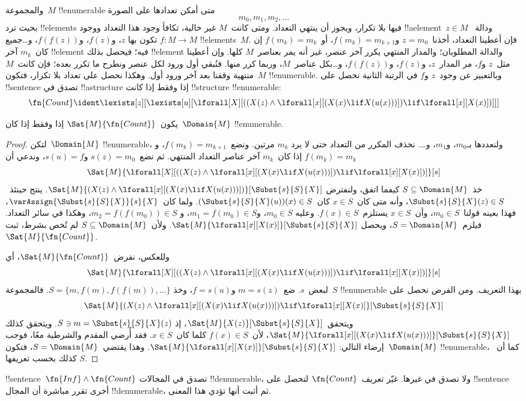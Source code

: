 \documentclass[../../../include/open-logic-section]{subfiles}
\begin{document}
والمجموعة~$M$ !!{enumerable} متى أمكن تعدادها على الصورة
\[
m_0, m_1, m_2, \dots
\]
بحيث ترد !!{element}s فيها بلا تكرار، ويجوز أن ينتهي التعداد.
ومتى كانت~$M$ غير خالية، تكافأ وجود هذا التعداد ووجود
!!a{element}~$z \in M$ ودالة~$f\colon M \to M$ تكون بها
  $z$، و$f(z)$، و$f(f(z))$، و\dots جميع !!{element}s~$M$.
  فإن أعطينا التعداد، أخذنا~$z = m_0$ و$f(m_k) = m_{k+1}$،
  أو~$f(m_k) = m_k$ إن كان~$m_k$ آخر !!{element} فيه؛
  فيحصل بذلك !!{element} والدالة المطلوبان؛ والمدار المنتهي يكرر
  آخر عنصر، غير أنه يمر بعناصر~$M$ كلها.
  وإن أعطينا مثل~$z$ و$f$، مر المدار~$z$، و$f(z)$،
  و$f(f(z))$، و\dots بكل عناصر~$M$، وربما كرر منها.
  فنُبقي أول ورود لكل عنصر ونطرح ما تكرر بعده؛ فإن كانت~$M$
  منتهية وقفنا بعد آخر ورود أول. وهكذا نحصل على تعداد بلا تكرار،
  فتكون~$M$ !!{enumerable}.
وبالتعبير عن وجود~$z$ و$f$ في الرتبة الثانية نحصل على
!!{sentence} تصدق في !!a{structure} إذا وفقط إذا كانت
!!{structure} !!{enumerable}:
\[
\fn{Count} \ident
\lexists[z][\lexists[u][\lforall[X][((X(z) \land
      \lforall[x][(X(x) \lif X(u(x)))]) \lif \lforall[x][X(x)])]]]
\]

\begin{prop}
يكون~$\Sat{M}{\fn{Count}}$ إذا وفقط إذا كان~$\Domain{M}$ !!{enumerable}.
\end{prop}

\begin{proof}
لتكن~$\Domain{M}$ !!{enumerable}، ولنعددها
بـ$m_0$، و$m_1$، و\dots. نحذف المكرر من التعداد حتى لا يرد
$m_k$ مرتين. ونضع~$f(m_k) = m_{k+1}$،
و$f(m_k)=m_k$ إذا كان~$m_k$ آخر عناصر التعداد المنتهي.
ثم نضع~$s(z) = m_0$ و$s(u) = f$، وندعي أن
\[
\Sat{M}{\lforall[X][((X(z) \land \lforall[x][(X(x) \lif X(u(x)))])
    \lif \lforall[x][X(x)])]}[s]
\]
خذ~$S \subseteq \Domain{M}$ كيفما اتفق، ولنفترض
$\Sat{M}{(X(z) \land \lforall[x][(X(x) \lif
X(u(x)))])}[\Subst{s}{S}{X}]$.
ينتج حينئذ~$\Subst{s}{S}{X}(z) \in S$،
وأنه متى كان~$x \in S$ كان~$(\Subst{s}{S}{X}(u))(x) \in S$.
ولما كان~$\varAssign{\Subst{s}{S}{X}}{s}{X}$،
فهذا بعينه قولنا~$m_0 \in S$، وأن~$x \in S$
يستلزم~$f(x) \in S$. وعليه
$m_0 \in S$، و$m_1 = f(m_0) \in S$، و
$m_2 = f(f(m_0)) \in S$، وهكذا في سائر التعداد.
فيلزم~$S = \Domain{M}$، ويحصل
$\Sat{M}{\lforall[x][X(x)]}[\Subst{s}{S}{X}]$.
ولأن~$S \subseteq \Domain{M}$ لم تُخص بشرط، ثبت
$\Sat{M}{\fn{Count}}$.

وللعكس، نفرض~$\Sat{M}{\fn{Count}}$، أي
\[
\Sat{M}{\lforall[X][((X(z) \land \lforall[x][(X(x) \lif X(u(x)))])
    \lif \lforall[x][X(x)])]}[s]
\]
لبعض~$s$. ضع~$m = s(z)$ و$f = s(u)$، وخذ
$S = \{m, f(m), f(f(m)), \dots\}$. فالمجموعة~$S$
!!{enumerable} بهذا التعريف. ومن الفرض نحصل على
\[
\Sat{M}{(X(z) \land \lforall[x][(X(x) \lif X(u(x)))])
    \lif \lforall[x][X(x)]}[\Subst{s}{S}{X}]
\]
ويتحقق~$\Sat{M}{X(z)}[\Subst{s}{S}{X}]$، إذ
$S \ni m = \Subst{s}{S}{X}(z)$. ويتحقق كذلك
$\Sat{M}{\lforall[x][(X(x) \lif
X(u(x)))]}[\Subst{s}{S}{X}]$، لأن~$f(x) \in S$ كلما كان~$x \in S$.
فقد أُرضي المقدم والشرطية معًا، فوجب إرضاء التالي:
$\Sat{M}{\lforall[x][X(x)]}[\Subst{s}{S}{X}]$.
وهذا يقتضي~$S = \Domain{M}$، فتكون~$\Domain{M}$ !!{enumerable}،
كما أن~$S$ كذلك بحسب تعريفها.
\end{proof}

\begin{prob}
!!{sentence}~$\fn{Inf} \land \fn{Count}$ تصدق في المجالات
!!{denumerable}، ولا تصدق في غيرها. غيّر تعريف~$\fn{Count}$
لتحصل على !!{sentence} أخرى تقرر مباشرة أن المجال
!!{denumerable}، ثم أثبت أنها تؤدي هذا المعنى.
\end{prob}
\end{document}
